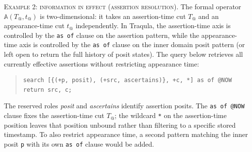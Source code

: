 \documentclass[a4paper,fleqn]{cas-sc}
\begin{document}
\textsc{Example 2: information in effect (assertion resolution).} The formal operator $\mathbb{A}(T_{@}, t_{@})$ is two-dimensional: it takes an assertion-time cut $T_{@}$ and an appearance-time cut $t_{@}$ independently. In Traqula, the assertion-time axis is controlled by the \texttt{as of} clause on the assertion pattern, while the appearance-time axis is controlled by the \texttt{as of} clause on the inner domain posit pattern (or left open to return the full history of posit states). The query below retrieves all currently effective assertions without restricting appearance time:
\begin{quote}
\small
\begin{verbatim}
search [{(+p, posit), (+src, ascertains)}, +c, *] as of @NOW
return src, c;
\end{verbatim}
\end{quote}
The reserved roles \textit{posit} and \textit{ascertains} identify assertion posits. The \texttt{as of @NOW} clause fixes the assertion-time cut $T_{@}$; the wildcard \texttt{*} on the assertion-time position leaves that position unbound rather than filtering to a specific stored timestamp. To also restrict appearance time, a second pattern matching the inner posit \texttt{p} with its own \texttt{as of} clause would be added.
\end{document}
